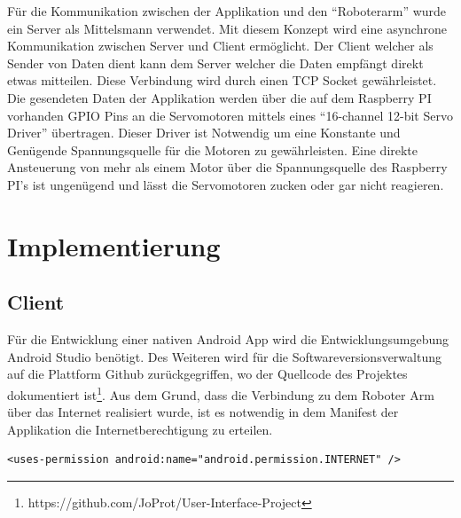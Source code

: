 \documentclass[12pt,					%
							 oneside,			%
							 a4paper,			%
							 halfparskip,		%
							 liststotoc,			%
							 bibtotoc,			%
							 fleqn,				%
							 pointlessnumbers]	%
							 {scrreprt}
\begin{document}

Für die Kommunikation zwischen der Applikation und den ``Roboterarm'' wurde ein Server als Mittelsmann verwendet. Mit diesem Konzept wird eine asynchrone Kommunikation zwischen Server und Client ermöglicht. Der Client welcher als Sender von Daten dient kann dem Server welcher die Daten empfängt direkt etwas mitteilen. Diese Verbindung wird durch einen TCP Socket gewährleistet. Die gesendeten Daten der Applikation werden über die auf dem Raspberry PI vorhanden GPIO Pins an die Servomotoren mittels eines  ``16-channel 12-bit Servo Driver'' übertragen. Dieser Driver ist Notwendig um eine Konstante und Genügende Spannungsquelle für die Motoren zu gewährleisten. Eine direkte Ansteuerung von mehr als einem Motor über die Spannungsquelle des Raspberry PI's ist ungenügend und lässt die Servomotoren zucken oder gar nicht reagieren.


\chapter{Implementierung}	
\section{Client}
Für die Entwicklung einer nativen Android App wird die Entwicklungsumgebung Android Studio benötigt. Des Weiteren wird für die Softwareversionsverwaltung auf die Plattform Github zurückgegriffen, wo der Quellcode des Projektes dokumentiert ist\footnote{https://github.com/JoProt/User-Interface-Project}. Aus dem Grund, dass die Verbindung zu dem Roboter Arm über das Internet realisiert wurde, ist es notwendig in dem Manifest der Applikation die Internetberechtigung zu erteilen. \\
\begin{lstlisting}
<uses-permission android:name="android.permission.INTERNET" />
\end{lstlisting}
\end{document}
